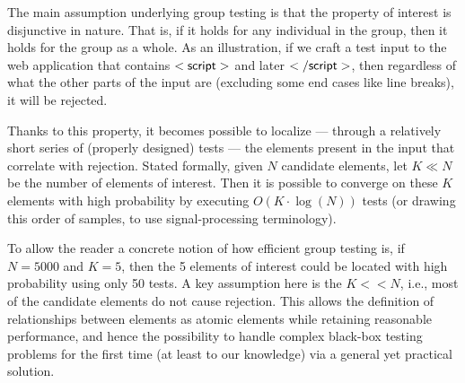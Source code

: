 The main assumption underlying group testing is that the property of interest is disjunctive in nature. That is, if it holds for any individual in the group, then it holds for the group as a whole. As an illustration, if we craft a test input to the web application that contains ${\sf <script>}$ and later ${\sf </script>}$, then regardless of what the other parts of the input are (excluding some end cases like line breaks), it will be rejected.

Thanks to this property, it becomes possible to localize --- through a relatively short series of (properly designed) tests --- the elements present in the input that correlate with rejection. Stated formally, given $N$ candidate elements, let $K \ll N$ be the number of elements of interest. Then it is possible to converge on these $K$ elements with high probability by executing $O(K \cdot \log (N))$ tests (or drawing this order of samples, to use signal-processing terminology).

To allow the reader a concrete notion of how efficient group testing is, if $N=5000$ and $K=5$, then the 5 elements of interest could be located with high probability using only 50 tests. A key assumption here is the $K<<N$, i.e., most of the candidate elements do not cause rejection. This allows the definition of relationships between elements as atomic elements while retaining reasonable performance, and hence the possibility to handle complex black-box testing problems for the first time (at least to our knowledge) via a general yet practical solution.